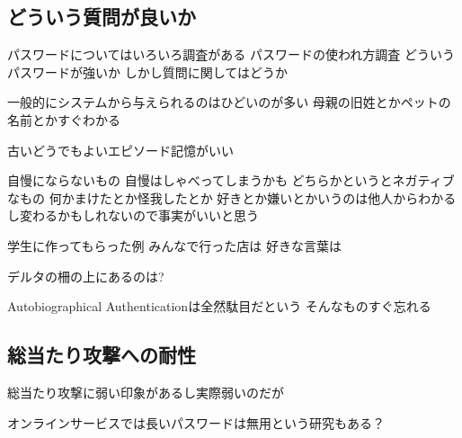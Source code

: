 \documentclass[twoside]{wiss}
\begin{document}


\subsection{どういう質問が良いか}

パスワードについてはいろいろ調査がある
\cite{Hayashi:2011:DSP:1978942.1979326}パスワードの使われ方調査
\cite{Komanduri:2011:PPM:1978942.1979321}どういうパスワードが強いか
しかし質問に関してはどうか

一般的にシステムから与えられるのはひどいのが多い
母親の旧姓とかペットの名前とかすぐわかる

古いどうでもよいエピソード記憶がいい

自慢にならないもの
  自慢はしゃべってしまうかも
どちらかというとネガティブなもの
  何かまけたとか怪我したとか
好きとか嫌いとかいうのは他人からわかるし変わるかもしれないので事実がいいと思う

学生に作ってもらった例
  みんなで行った店は
  好きな言葉は

デルタの柵の上にあるのは?

Autobiographical Authenticationは全然駄目だという\cite{林}
そんなものすぐ忘れる

\subsection{総当たり攻撃への耐性}

総当たり攻撃に弱い印象があるし実際弱いのだが

オンラインサービスでは長いパスワードは無用という研究もある？
\cite{Florencio:2007:SWP:1361419.1361429}
\end{document}
